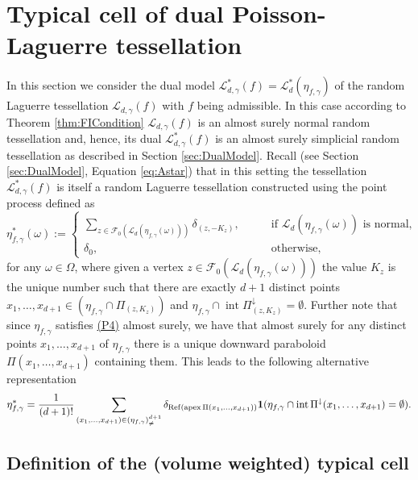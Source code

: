 \documentclass[11pt,a4paper]{article}
\theoremstyle{plain}
\theoremstyle{definition}
\theoremstyle{remark}
\def\cF{\mathcal{F}}
\def\cL{\mathcal{L}}
\newcommand{\inter}{\operatorname{int}}
\newcommand{\apex}{\mathop{\mathrm{apex}}\nolimits}
\begin{document}
\section{Typical cell of dual Poisson-Laguerre tessellation}\label{sec:typcell}

In this section we consider the dual model $\cL^*_{d,\gamma}(f)=\cL^*_d(\eta_{f,\gamma})$ of the random Laguerre tessellation $\cL_{d,\gamma}(f)$ with $f$ being admissible. In this case according to Theorem \ref{thm:FICondition} $\cL_{d,\gamma}(f)$ is an almost surely normal random tessellation and, hence, its dual $\cL^*_{d,\gamma}(f)$ is an almost surely simplicial random tessellation as described in Section \ref{sec:DualModel}. Recall (see Section \ref{sec:DualModel}, Equation \eqref{eq:Astar}) that in this setting the tessellation $\cL^*_{d,\gamma}(f)$ is itself a random Laguerre tessellation constructed using the point process defined as
\[
    \eta_{f,\gamma}^*(\omega):=\begin{cases}
        \sum_{z\in\cF_0(\cL_d(\eta_{f,\gamma}(\omega)))}\delta_{(z,-K_z)},\qquad &\text{if }\cL_d(\eta_{f,\gamma}(\omega))\text{ is normal},\\
        \delta_0,\qquad&\text{otherwise},
    \end{cases}
\]
for any $\omega\in\Omega$, where given a vertex $z\in\cF_0(\cL_d(\eta_{f,\gamma}(\omega)))$ the value $K_z$ is the unique number such that there are exactly $d+1$ distinct points $x_1,\ldots,x_{d+1}\in (\eta_{f,\gamma}\cap \Pi_{(z,K_z)})$ and $\eta_{f,\gamma}\cap \inter \Pi_{(z,K_z)}^{\downarrow}=\emptyset$. Further note that since $\eta_{f,\gamma}$ satisfies \hyperref[item:P4]{(P4)} almost surely, we have that almost surely for any distinct points $x_1,\ldots,x_{d+1}$ of $\eta_{f,\gamma}$ there is a unique downward paraboloid $\Pi(x_1,\ldots,x_{d+1})$ containing them. This leads to the following alternative representation
\begin{equation}\label{eq:DualProcess}
\eta_{f,\gamma}^*={1\over (d+1)!}\sum_{(x_1,\ldots,x_{d+1})\in (\eta_{f,\gamma})_{\neq}^{d+1}}\delta_{{\rm Ref}(\apex \Pi(x_1,\ldots,x_{d+1}))}{\bf 1}(\eta_{f,\gamma}\cap \inter\Pi^{\downarrow}(x_1,\ldots,x_{d+1})=\emptyset).
\end{equation}

\subsection{Definition of the (volume weighted) typical cell}
\end{document}
